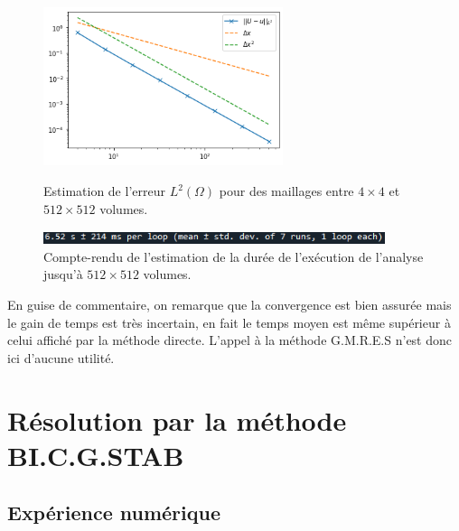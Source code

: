 \begin{figure}[htp]
\centering
    \includegraphics[width=7cm]{Images/preliminaires/Laplace Dirichlet 2D creux GMRES/analyse.png}
    \caption{Estimation de l'erreur $L^2(\Omega)$ pour des maillages entre $4\times 4$ et $512 \times 512$ volumes.}
    \vspace{1cm}
    \includegraphics[width=10cm]{Images/preliminaires/Laplace Dirichlet 2D creux GMRES/temps.png}
    \caption{Compte-rendu de l'estimation de la durée de l'exécution de l'analyse jusqu'à $512 \times 512$ volumes.}
    \label{fig:creuxLaplacienDirichlet2DGMRESTemps}
\end{figure}

\newpage

En guise de commentaire, on remarque que la convergence est bien assurée mais le gain de temps est très incertain, en fait le temps moyen est même supérieur à celui affiché par la méthode directe. L'appel à la méthode G.M.R.E.S n'est donc ici d'aucune utilité.

\section{Résolution par la méthode BI.C.G.STAB}

\subsection*{Expérience numérique} 

